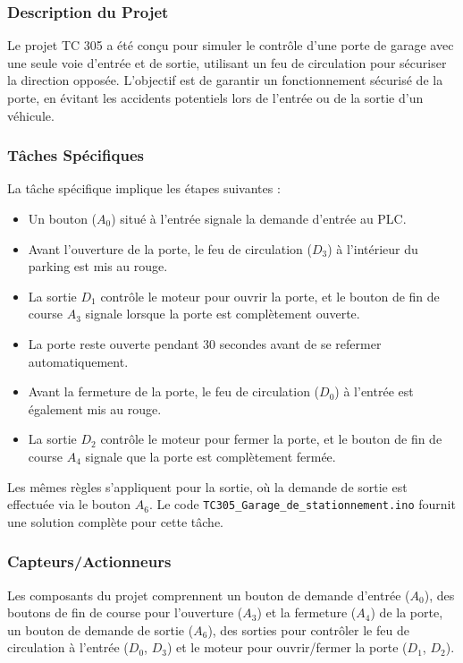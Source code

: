 \documentclass[a4paper,12pt]{report}
\begin{document}
\subsubsection{Description du Projet}

Le projet TC 305 a été conçu pour simuler le contrôle d'une porte de garage avec une seule voie d'entrée et de sortie, utilisant un feu de circulation pour sécuriser la direction opposée. L'objectif est de garantir un fonctionnement sécurisé de la porte, en évitant les accidents potentiels lors de l'entrée ou de la sortie d'un véhicule.

\subsubsection{Tâches Spécifiques}

La tâche spécifique implique les étapes suivantes :
\begin{itemize}
    \item Un bouton (\(A_0\)) situé à l'entrée signale la demande d'entrée au PLC.
    \item Avant l'ouverture de la porte, le feu de circulation (\(D_3\)) à l'intérieur du parking est mis au rouge.
    \item La sortie \(D_1\) contrôle le moteur pour ouvrir la porte, et le bouton de fin de course \(A_3\) signale lorsque la porte est complètement ouverte.
    \item La porte reste ouverte pendant 30 secondes avant de se refermer automatiquement.
    \item Avant la fermeture de la porte, le feu de circulation (\(D_0\)) à l'entrée est également mis au rouge.
    \item La sortie \(D_2\) contrôle le moteur pour fermer la porte, et le bouton de fin de course \(A_4\) signale que la porte est complètement fermée.
\end{itemize}
Les mêmes règles s'appliquent pour la sortie, où la demande de sortie est effectuée via le bouton \(A_6\).
Le code \texttt{TC305\_Garage\_de\_stationnement.ino} fournit une solution complète pour cette tâche.

\subsubsection{Capteurs/Actionneurs}

Les composants du projet comprennent un bouton de demande d'entrée (\(A_0\)), des boutons de fin de course pour l'ouverture (\(A_3\)) et la fermeture (\(A_4\)) de la porte, un bouton de demande de sortie (\(A_6\)), des sorties pour contrôler le feu de circulation à l'entrée (\(D_0\), \(D_3\)) et le moteur pour ouvrir/fermer la porte (\(D_1\), \(D_2\)).
\end{document}
